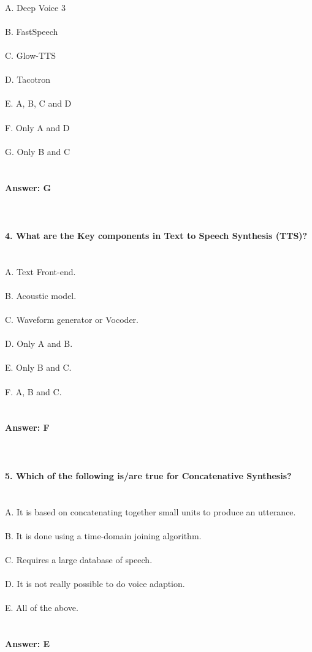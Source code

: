 \documentclass[prl,twocolumn,showpacs,preprintnumbers,superscriptaddress]{revtex4}
\theoremstyle{plain}
\theoremstyle{definition}
\begin{document}
\begin{widetext}
\\
A. Deep Voice 3
\\
\\
B. FastSpeech 
\\
\\
C. Glow-TTS 
\\
\\
D. Tacotron
\\
\\
E. A, B, C and D
\\
\\
F. Only A and D
\\
\\
G. Only B and C
\\
\\
\\
\textbf{Answer: G}
\\
\\
\\
\\
\textbf{4. What are the Key components in Text to Speech Synthesis (TTS)?}
\\
\\
\\
A. Text Front-end.
\\
\\
B. Acoustic model.
\\
\\
C. Waveform generator or Vocoder.
\\
\\
D. Only A and B.
\\
\\
E. Only B and C.
\\
\\
F. A, B and C.
\\
\\
\\
\textbf{Answer: F}
\\
\\
\\
\\
\textbf{5. Which of the following is/are true for Concatenative Synthesis?}
\\
\\
\\
A. It is based on concatenating together small units to produce an utterance.
\\
\\
B. It is done using a time-domain joining algorithm.
\\
\\
C. Requires a large database of speech.
\\
\\
D. It is not really possible to do voice adaption.
\\
\\
E. All of the above.
\\
\\
\\
\textbf{Answer: E}
\\
\\
\\
\\
\\
\\
\end{widetext}
\end{document}
